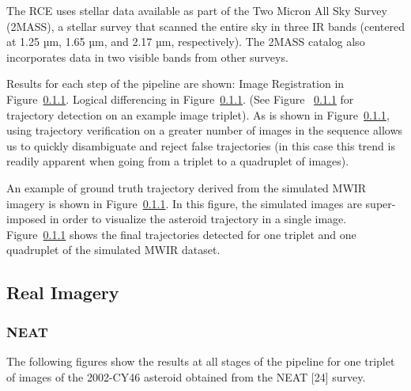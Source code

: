 The RCE uses stellar data available as part of the Two Micron All Sky Survey (2MASS), a stellar survey that scanned the entire sky in three IR bands (centered at 1.25 µm, 1.65 µm, and 2.17 µm, respectively).  The 2MASS catalog also incorporates data in two visible bands from other surveys. 
 
Results for each step of the pipeline are shown:
 Image Registration in Figure~\ref{}. Logical differencing in Figure~\ref{}. (See Figure ~\ref{} for trajectory detection on an example image triplet).    As is shown in Figure~\ref{}, using trajectory verification on a greater number of images in the sequence allows us to quickly disambiguate and reject false trajectories (in this case this trend is readily apparent when going from a triplet to a quadruplet of images).

An example of ground truth trajectory derived from the simulated MWIR imagery is shown in Figure~\ref{}. In this figure, the simulated images are super-imposed in order to visualize the asteroid trajectory in a single image. Figure~\ref{} shows the final trajectories detected for one triplet and one quadruplet of the simulated MWIR dataset.
 
\subsection{Real Imagery}
\label{ssec:real}

\subsubsection{NEAT}
The following figures show the results at all stages of the pipeline for one triplet of images of the 2002-CY46 asteroid obtained from the NEAT [24] survey.  

